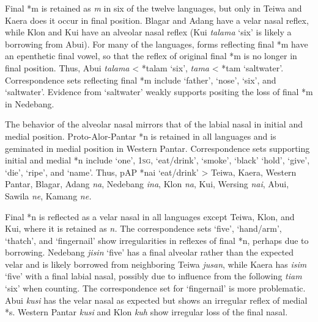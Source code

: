 Final *m is retained as \textit{m }in six of the twelve languages, but only in Teiwa and Kaera does it occur in final position. Blagar and Adang have a velar nasal reflex, while Klon and Kui have an alveolar nasal reflex (Kui \textit{talama} {\textquoteleft}six{\textquoteright} is likely a borrowing from Abui). For many of the languages, forms reflecting final *m have an epenthetic final vowel, so that the reflex of original final *m is no longer in final position. Thus, Abui \textit{tala{\textlengthmark}ma }{\textless} *talam {\textquoteleft}six{\textquoteright}, \textit{tama} {\textless} *tam {\textquoteleft}saltwater{\textquoteright}. Correspondence sets reflecting final *m include {\textquoteleft}father{\textquoteright}, {\textquoteleft}nose{\textquoteright}, {\textquoteleft}six{\textquoteright}, and {\textquoteleft}saltwater{\textquoteright}. Evidence from {\textquoteleft}saltwater{\textquoteright} weakly supports positing the loss of final *m in Nedebang. 

The behavior of the alveolar nasal mirrors that of the labial nasal in initial and medial position. Proto-Alor-Pantar *n is retained in all languages and is geminated in medial position in Western Pantar. Correspondence sets supporting initial and medial *n include {\textquoteleft}one{\textquoteright}, \textsc{1sg}, {\textquoteleft}eat/drink{\textquoteright}, {\textquoteleft}smoke{\textquoteright}, {\textquoteleft}black{\textquoteright} {\textquoteleft}hold{\textquoteright}, {\textquoteleft}give{\textquoteright}, {\textquoteleft}die{\textquoteright}, {\textquoteleft}ripe{\textquoteright}, and {\textquoteleft}name{\textquoteright}. Thus, pAP *nai {\textquoteleft}eat/drink{\textquoteright} {\textgreater} Teiwa, Kaera, Western Pantar, Blagar, Adang \textit{na}, Nedebang \textit{ina}, Klon \textit{na{\textlengthmark}{\textglotstop}}, Kui, Wersing \textit{nai}, Abui, Sawila \textit{ne{\textlengthmark}}, Kamang \textit{ne. }

Final *n is reflected as a velar nasal in all languages except Teiwa, Klon, and Kui, where it is retained as \textit{n. }The correspondence sets {\textquoteleft}five{\textquoteright}, {\textquoteleft}hand/arm{\textquoteright}, {\textquoteleft}thatch{\textquoteright}, and {\textquoteleft}fingernail{\textquoteright} show irregularities in reflexes of final *n, perhaps due to borrowing. Nedebang \textit{jisin }{\textquoteleft}five{\textquoteright} has a final alveolar rather than the expected velar and is likely borrowed from neighboring Teiwa \textit{jusan}, while Kaera has \textit{isim} {\textquoteleft}five{\textquoteright} with a final labial nasal, possibly due to influence from the following \textit{tiam} {\textquoteleft}six{\textquoteright} when counting. The correspondence set for {\textquoteleft}fingernail{\textquoteright} is more problematic. Abui \textit{kusi{\ng} }has the velar nasal as expected but shows an irregular reflex of medial *s. Western Pantar \textit{kusi }and Klon \textit{kuh} show 
irregular loss of the final nasal. 

